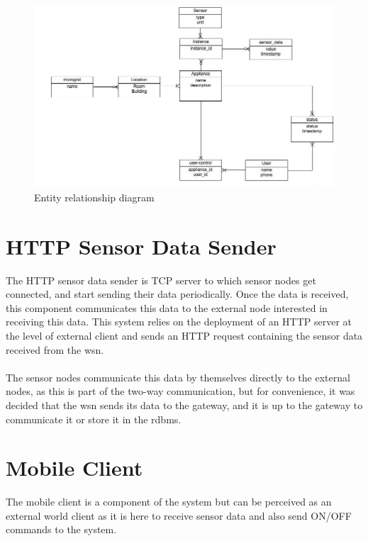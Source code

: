 \documentclass[12pt,a4paper,final]{report}
\begin{document}
\begin{figure}[htbp]
\centering
\includegraphics[scale=0.5]{img/smart_grid_db.jpg}
\caption{Entity relationship diagram}
\label{fig:erd}
\end{figure}

\section{HTTP Sensor Data Sender} 
The HTTP sensor data sender is TCP server to which sensor nodes get connected, and start sending their data periodically. Once the data is received, this component communicates this data to the external node interested in receiving this data. This system relies on the deployment of an HTTP server at the level of external client and sends an HTTP request containing the sensor data received from the \gls{wsn}. 
\paragraph{}
The sensor nodes communicate this data by themselves directly to the external nodes, as this is part of the two-way communication, but for convenience, it was decided that the \gls{wsn} sends its data to the gateway, and it is up to the gateway to communicate it or store it in the \gls{rdbms}.
\section{Mobile Client}
The mobile client is a component of the system but can be perceived as an external world client as it is here to receive sensor data and also send ON/OFF commands to the system.
\section*{}
\end{document}
